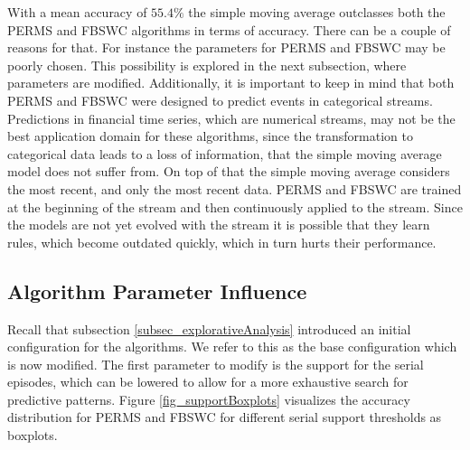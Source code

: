 With a mean accuracy of $55.4\%$ the simple moving average outclasses both the PERMS and FBSWC algorithms in terms of accuracy. There can be a couple of reasons for that. For instance the parameters for PERMS and FBSWC may be poorly chosen. This possibility is explored in the next subsection, where parameters are modified. Additionally, it is important to keep in mind that both PERMS and FBSWC were designed to predict events in categorical streams. Predictions in financial time series, which are numerical streams, may not be the best application domain for these algorithms, since the transformation to categorical data leads to a loss of information, that the simple moving average model does not suffer from. On top of that the simple moving average considers the most recent, and only the most recent data. PERMS and FBSWC are trained at the beginning of the stream and then continuously applied to the stream. Since the models are not yet evolved with the stream it is possible that they learn rules, which become outdated quickly, which in turn hurts their performance.


\subsection{Algorithm Parameter Influence}
Recall that subsection \ref{subsec_explorativeAnalysis} introduced an initial configuration for the algorithms. We refer to this as the base configuration which is now modified. The first parameter to modify is the support for the serial episodes, which can be lowered to allow for a more exhaustive search for predictive patterns. Figure \ref{fig_supportBoxplots} visualizes the accuracy distribution for PERMS and FBSWC for different serial support thresholds as boxplots.

